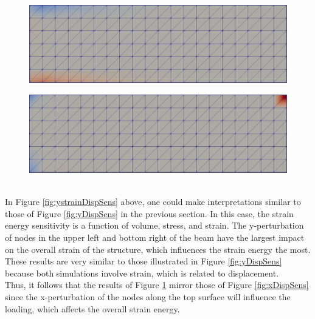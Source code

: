 \begin{figure}[ht]
\centering
\begin{minipage}{.5\textwidth}
  \centering
  \includegraphics[width=0.95\linewidth]{images/strainsensitivityanalysisY.png}
  \label{fig:ystrainDispSens}
\end{minipage}%
\begin{minipage}{.5\textwidth}
  \centering
  \includegraphics[width=0.95\linewidth]{images/strainsensitivityanalysisX.png}
  \label{fig:xstrainDispSens}
\end{minipage}
\end{figure}\\
In Figure \ref{fig:ystrainDispSens} above, one could make interpretations similar to those of Figure \ref{fig:yDispSens} in the previous section. In this case, the strain energy sensitivity is a function of volume, stress, and strain. The y-perturbation of nodes in the upper left and bottom right of the beam have the largest impact on the overall strain of the structure, which influences the strain energy the most. These results are very similar to those illustrated in Figure \ref{fig:yDispSens} because both simulations involve strain, which is related to displacement.\\[6pt]
Thus, it follows that the results of Figure \ref{fig:xstrainDispSens} mirror those of Figure \ref{fig:xDispSens} since the x-perturbation of the nodes along the top surface will influence the loading, which affects the overall strain energy.

